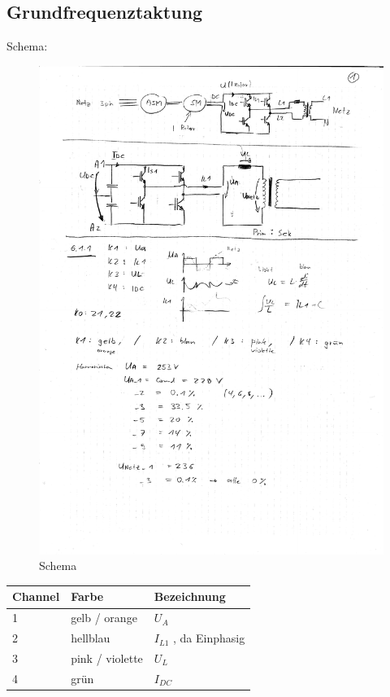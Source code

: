 \subsection{Grundfrequenztaktung}

\noindent Schema:

\begin{figure}[ht]
  \begin{center}
  \includegraphics[width=1\textwidth, trim={1cm 19.38cm 1cm 5cm},clip]{notes/scan1.pdf}
  \caption{Schema}
  \label{fig:schema}
  \end{center}
\end{figure}



\begin{center}
\begin{tabular}{ l | l | l }
  \hline 
  Channel & Farbe & Bezeichnung \\
  \hline \hline
  1 & gelb / orange &  $U_A$ \\
  \hline
  2 & hellblau & $I_{L1}$ , da Einphasig\\  
  \hline 
  3 & pink / violette & $U_{L}$ \\  
  \hline
  4 & grün & $I_{DC}$ \\  
  \hline
\end{tabular}
\end{center}


\clearpage